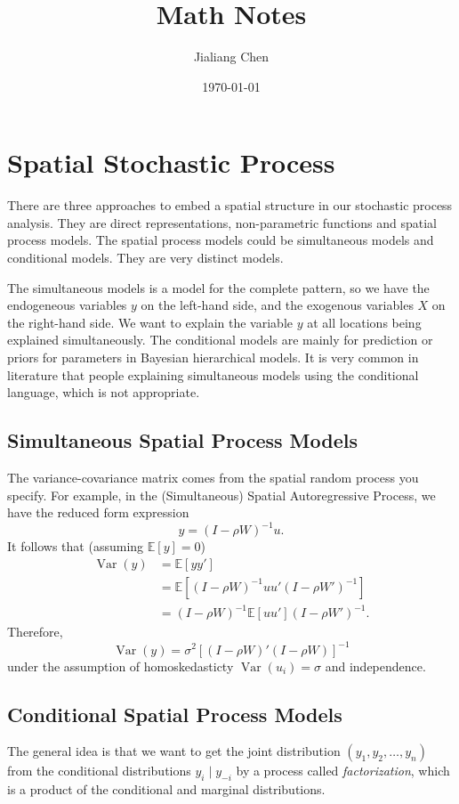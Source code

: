 \documentclass[11pt,a4paper]{amsart}
\theoremstyle{plain}
\theoremstyle{definition}
\begin{document}
\title{Math Notes}
\author{Jialiang Chen} 
\date{\today}
\maketitle
\tableofcontents

\section{Spatial Stochastic Process}
There are three approaches to embed a spatial structure in our stochastic process analysis. They are direct representations, non-parametric functions and spatial process models. The spatial process models could be simultaneous models and conditional models. They are very distinct models. 

The simultaneous models is a model for the complete pattern, so we have the endogeneous variables $y$ on the left-hand side, and the exogenous variables $X$ on the right-hand side. We want to explain the variable $y$ at all locations being explained simultaneously. The conditional models are mainly for prediction or priors for parameters in Bayesian hierarchical models. It is very common in literature that people explaining simultaneous models using the conditional language, which is not appropriate.

\subsection{Simultaneous Spatial Process Models}\hfill\par 
The variance-covariance matrix comes from the spatial random process you specify. For example, in the (Simultaneous) Spatial Autoregressive Process, we have the reduced form expression
\[	y = (I - \rho W)^{-1}u.	\]
It follows that (assuming $\mathbb{E}[y] = 0$)
\[	\begin{aligned}
	\operatorname{Var}(y) &= \mathbb{E}[yy']\\
	&= \mathbb{E}[(I - \rho W)^{-1}uu'(I-\rho W')^{-1}] \\
	&= (I - \rho W)^{-1}\mathbb{E}[uu'](I-\rho W')^{-1}.
\end{aligned}	\]
Therefore, 
\[		\operatorname{Var}(y)  = \sigma^{2} [ (I - \rho W)'(I - \rho W)]^{-1}	\]
under the assumption of homoskedasticty $\operatorname{Var}(u_{i}) = \sigma$ and independence.

\subsection{Conditional Spatial Process Models}\hfill\par 
The general idea is that we want to get the joint distribution $(y_{1}, y_{2}, \dots, y_{n})$ from the conditional distributions $y_{i} \mid y_{-i}$ by a process called \textit{factorization}, which is a product of the conditional and marginal distributions. 
\end{document}
